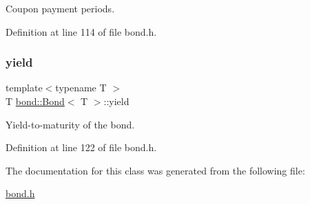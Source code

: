 Coupon payment periods. 



Definition at line 114 of file bond.\+h.

\mbox{\label{classbond_1_1_bond_ac79ec630d68f58775849145ab305d5f8}} 
\subsubsection{\texorpdfstring{yield}{yield}}
{\footnotesize\ttfamily template$<$typename T $>$ \\
T \hyperlink{classbond_1_1_bond}{bond\+::\+Bond}$<$ T $>$\+::yield\hspace{0.3cm}{\ttfamily [private]}}



Yield-\/to-\/maturity of the bond. 



Definition at line 122 of file bond.\+h.



The documentation for this class was generated from the following file\+:\begin{DoxyCompactItemize}
\item 
\hyperlink{bond_8h}{bond.\+h}\end{DoxyCompactItemize}

